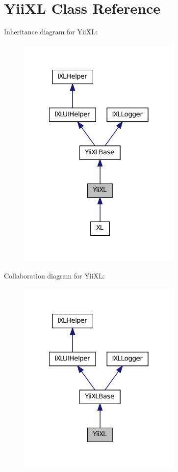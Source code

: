 \hypertarget{classYiiXL}{
\section{YiiXL Class Reference}
\label{classYiiXL}
}


Inheritance diagram for YiiXL:\nopagebreak
\begin{figure}[H]
\begin{center}
\leavevmode
\includegraphics[width=230pt]{classYiiXL__inherit__graph}
\end{center}
\end{figure}


Collaboration diagram for YiiXL:\nopagebreak
\begin{figure}[H]
\begin{center}
\leavevmode
\includegraphics[width=230pt]{classYiiXL__coll__graph}
\end{center}
\end{figure}


